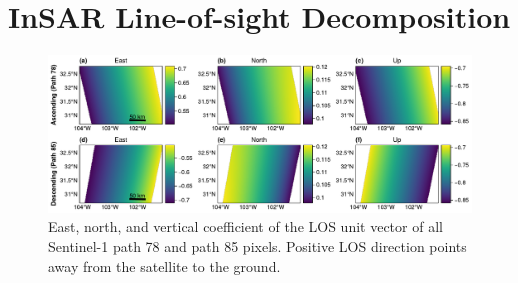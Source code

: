 %
%
%
%
%
%
%
%
%





\section{InSAR Line-of-sight Decomposition}
\label{sec:ch2-insar-decomp}


\begin{figure}
	\centering
	\includegraphics[width=.98\textwidth]{figures/chapter2-sar/figure_los_enu_coeffs.pdf}
	\caption[East, north, and vertical coefficients of Sentinel-1 LOS vectors]{East, north, and vertical coefficient of the LOS unit vector of all Sentinel-1 path 78 and path 85 pixels. Positive LOS direction points away from the satellite to the ground.
	}
	\label{fig:los-map}
\end{figure}

